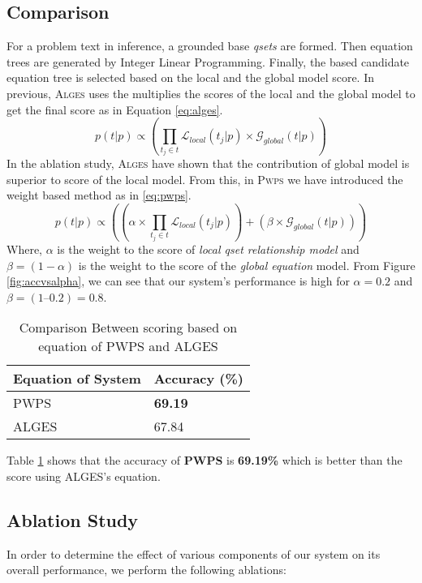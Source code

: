 \documentclass[document.tex]{subfiles}
\begin{document}
\subsection{Comparison}
For a problem text in inference, a grounded base \textit{qsets} are formed. Then equation trees are generated by Integer Linear Programming. Finally, the based candidate equation tree is selected based on the local and the global model score. In previous, \textsc{Alges} uses the multiplies the scores of the local and the global model to get the final score as in Equation \eqref{eq:alges}.
\begin{equation}
p(t|p) \propto (\prod_{t_j \in t} \mathcal{L}_{local}(t_j|p) \times \mathcal{G}_{global}(t|p))
\label{eq:alges}
\end{equation}
In the ablation study, \textsc{Alges} have shown that the contribution of global model is superior to score of the local model. From this, in \textsc{Pwps} we have introduced the weight based method as in \eqref{eq:pwps}.
\begin{equation}
p(t|p) \propto( (\alpha  \times \prod_{t_j \in t} \mathcal{L}_{local}(t_j | p)) +( \beta \times \mathcal{G}_{global}(t|p)))
\label{eq:pwps}
\end{equation}
Where, $\alpha $ is the weight to the score of \textit{local qset relationship model} and $\beta = (1 - \alpha) $ is the weight to the score of the \textit{global equation} model.
From Figure \ref{fig:accvsalpha}, we can see that our system’s performance is high for $\alpha = 0.2$ and $\beta  = (1 – 0.2) = 0.8$.
\begin{table}[H]
	\caption{Comparison Between scoring based on equation of PWPS and ALGES}
	\begin{center}
		\begin{tabular}{|l|l|}
			\hline
			Equation of System & Accuracy (\%)\\
			\hline
			PWPS & \textbf{69.19}\\
			ALGES & 67.84\\
			\hline
		\end{tabular}
	\end{center}
	\label{tab:comp}
\end{table}


Table \ref{tab:comp} shows that the accuracy of \textbf{PWPS} is \textbf{69.19\%} which is better than the score using ALGES’s equation.

\subsection{Ablation Study}
In order to determine the effect of various components of our system on its overall performance, we perform the following ablations:
\end{document}
